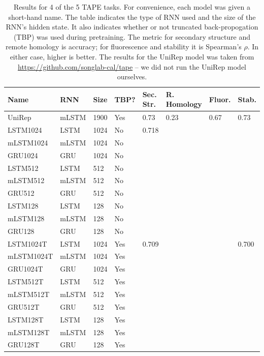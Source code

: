 \documentclass[a4paper,12pt]{article}
\begin{document}
\begin{table}[ht]
\begin{tabularx}{\linewidth}{Llllllll}
\toprule
\textbf{Name} & \textbf{RNN} & \textbf{Size} & \textbf{TBP?} & \textbf{Sec. Str.} & \textbf{R. Homology} & \textbf{Fluor.} & \textbf{Stab.} \\ \hline
UniRep     & mLSTM & 1900 & Yes  & 0.73      & 0.23         & 0.67   & 0.73  \\
LSTM1024   & LSTM  & 1024 & No   & 0.718     &              &        &       \\
mLSTM1024  & mLSTM & 1024 & No   &           &              &        &       \\
GRU1024    & GRU   & 1024 & No   &           &              &        &       \\
LSTM512    & LSTM  & 512  & No   &           &              &        &       \\
mLSTM512   & mLSTM & 512  & No   &           &              &        &       \\
GRU512     & GRU   & 512  & No   &           &              &        &       \\
LSTM128    & LSTM  & 128  & No   &           &              &        &       \\
mLSTM128   & mLSTM & 128  & No   &           &              &        &       \\
GRU128     & GRU   & 128  & No   &           &              &        &       \\
LSTM1024T  & LSTM  & 1024 & Yes  & 0.709     &              &        & 0.700 \\
mLSTM1024T & mLSTM & 1024 & Yes  &           &              &        &       \\
GRU1024T   & GRU   & 1024 & Yes  &           &              &        &       \\
LSTM512T   & LSTM  & 512  & Yes  &           &              &        &       \\
mLSTM512T  & mLSTM & 512  & Yes  &           &              &        &       \\
GRU512T    & GRU   & 512  & Yes  &           &              &        &       \\
LSTM128T   & LSTM  & 128  & Yes  &           &              &        &       \\
mLSTM128T  & mLSTM & 128  & Yes  &           &              &        &       \\
GRU128T    & GRU   & 128  & Yes  &           &              &        &       \\ \bottomrule
\end{tabularx}
\caption{Results for 4 of the 5 TAPE tasks. For convenience, each model was given a short-hand name. The table indicates the type of RNN used and the size of the RNN's hidden state. It also indicates whether or not truncated back-propogation (TBP) was used during pretraining. The metric for secondary structure and remote homology is accuracy; for fluorescence and stability it is Spearman's $\rho$. In either case, higher is better. The results for the UniRep model was taken from \url{https://github.com/songlab-cal/tape} -- we did not run the UniRep model ourselves.}
\label{table:taperesults}
\end{table}
\end{document}

